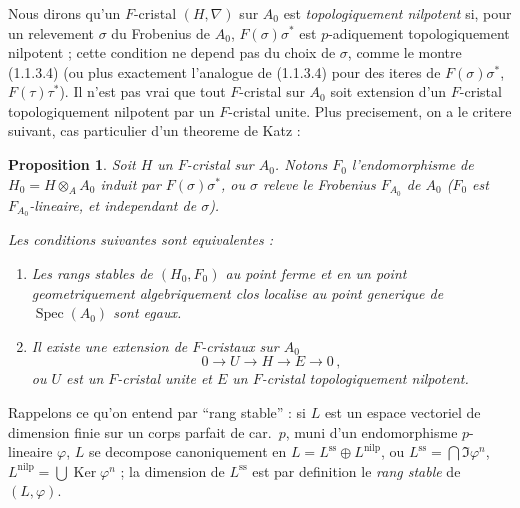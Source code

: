 \documentclass[12pt,a4paper]{article}
\theoremstyle{plain}
\newtheorem{proposition}[theorem]{Proposition}
\theoremstyle{definition}
\theoremstyle{remark}
\DeclareMathOperator{\Spec}{Spec}
\DeclareMathOperator{\Ker}{Ker}
\begin{document}
\subsubsection{}

Nous dirons qu'un $F$-cristal $(H,\nabla)$ sur $A_0$ est \emph{topologiquement nilpotent} si, pour un relevement $\sigma$ du Frobenius de $A_0$, $F(\sigma)\sigma^*$ est $p$-adiquement topologiquement nilpotent ; cette condition ne depend pas du choix de $\sigma$, comme le montre (1.1.3.4) (ou plus exactement l'analogue de (1.1.3.4) pour des iteres de $F(\sigma)\sigma^*$, $F(\tau)\tau^*$). Il n'est pas vrai que tout $F$-cristal sur $A_0$ soit extension d'un $F$-cristal topologiquement nilpotent par un $F$-cristal unite. Plus precisement, on a le critere suivant, cas particulier d'un theoreme de Katz :

\begin{proposition}\label{prop:1.2.4}
Soit $H$ un $F$-cristal sur $A_0$. Notons $F_0$ l'endomorphisme de $H_0 = H \otimes_A A_0$ induit par $F(\sigma)\sigma^*$, ou $\sigma$ releve le Frobenius $F_{A_0}$ de $A_0$ ($F_0$ est $F_{A_0}$-lineaire, et independant de $\sigma$).

Les conditions suivantes sont equivalentes :
\begin{enumerate}[label=(\roman*)]
\item Les rangs stables de $(H_0, F_0)$ au point ferme et en un point geometriquement algebriquement clos localise au point generique de $\Spec(A_0)$ sont egaux.
\item Il existe une extension de $F$-cristaux sur $A_0$
\[
0 \longrightarrow U \longrightarrow H \longrightarrow E \longrightarrow 0\,,
\]
ou $U$ est un $F$-cristal unite et $E$ un $F$-cristal topologiquement nilpotent.
\end{enumerate}
\end{proposition}

Rappelons ce qu'on entend par ``rang stable'' : si $L$ est un espace vectoriel de dimension finie sur un corps parfait de car.\ $p$, muni d'un endomorphisme $p$-lineaire $\varphi$, $L$ se decompose canoniquement en $L = L^{\mathrm{ss}} \oplus L^{\mathrm{nilp}}$, ou $L^{\mathrm{ss}} = \bigcap \Im \varphi^n$, $L^{\mathrm{nilp}} = \bigcup \Ker \varphi^n$ ; la dimension de $L^{\mathrm{ss}}$ est par definition le \emph{rang stable} de $(L,\varphi)$.
\end{document}
